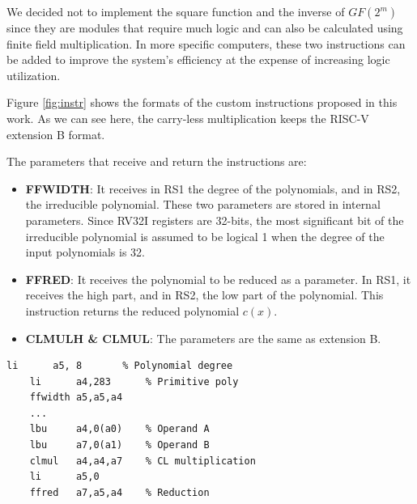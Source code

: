 We decided not to implement the square function and the inverse of $GF(2^m)$ since they are modules that require much logic 
and can also be calculated using finite field multiplication. In more specific computers, these two instructions can be added to 
improve the system's efficiency at the expense of increasing logic utilization.

Figure \ref{fig:instr} shows the formats of the custom instructions proposed in this work. As we can see here, the carry-less multiplication 
keeps the RISC-V extension B format. 

The parameters that receive and return the instructions are:

\begin{itemize}
    \item \textbf{FFWIDTH}: It receives in RS1 the degree of the polynomials, and in RS2, the irreducible polynomial. 
    These two parameters are stored in internal parameters. Since RV32I registers are 32-bits, 
    the most significant bit of the irreducible polynomial is assumed to be logical 1 when the degree of the input polynomials is 32.
    \item \textbf{FFRED}: It receives the polynomial to be reduced as a parameter. In RS1, it receives the high part, and in RS2, the low part of the polynomial. 
    This instruction returns the reduced polynomial $c(x)$. 
    \item \textbf{CLMULH \& CLMUL}: The parameters are the same as extension B.
\end{itemize}


\begin{lstlisting}[caption={GF multiplication for AES.},captionpos=b,label={lst:aes}]
    li	    a5, 8       % Polynomial degree
    li	    a4,283      % Primitive poly
    ffwidth	a5,a5,a4    
    ...
    lbu	    a4,0(a0)    % Operand A
    lbu	    a7,0(a1)    % Operand B
    clmul	a4,a4,a7    % CL multiplication
    li	    a5,0
    ffred	a7,a5,a4    % Reduction
\end{lstlisting}

